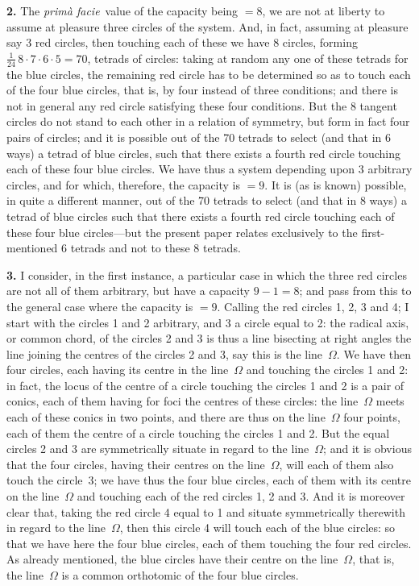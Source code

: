 \documentclass[12pt,a4paper]{article}
\newcommand{\primd}{\textit{prim\`a facie}}
\begin{document}
\textbf{2.} The \primd\ value of the capacity being $=8$, we are not at liberty to assume at pleasure three circles of the system. And, in fact, assuming at pleasure say 3 red circles, then touching each of these we have 8 circles, forming $\frac{1}{24}\, 8 \cdot 7 \cdot 6 \cdot 5 = 70$, tetrads of circles: taking at random any one of these tetrads for the blue circles, the remaining red circle has to be determined so as to touch each of the four blue circles, that is, by four instead of three conditions; and there is not in general any red circle satisfying these four conditions. But the 8 tangent circles do not stand to each other in a relation of symmetry, but form in fact four pairs of circles; and it is possible out of the 70 tetrads to select (and that in 6 ways) a tetrad of blue circles, such that there exists a fourth red circle touching each of these four blue circles. We have thus a system depending upon 3 arbitrary circles, and for which, therefore, the capacity is $=9$. It is (as is known) possible, in quite a different manner, out of the 70 tetrads to select (and that in 8 ways) a tetrad of blue circles such that there exists a fourth red circle touching each of these four blue circles---but the present paper relates exclusively to the first-mentioned 6 tetrads and not to these 8 tetrads.

\textbf{3.} I consider, in the first instance, a particular case in which the three red circles are not all of them arbitrary, but have a capacity $9-1=8$; and pass from this to the general case where the capacity is $=9$. Calling the red circles 1, 2, 3 and 4; I start with the circles 1 and 2 arbitrary, and 3 a circle equal to 2: the radical axis, or common chord, of the circles 2 and 3 is thus a line bisecting at right angles the line joining the centres of the circles 2 and 3, say this is the line~$\Omega$. We have then four circles, each having its centre in the line~$\Omega$ and touching the circles 1 and 2: in fact, the locus of the centre of a circle touching the circles 1 and 2 is a pair of conics, each of them having for foci the centres of these circles: the line~$\Omega$ meets each of these conics in two points, and there are thus on the line~$\Omega$ four points, each of them the centre of a circle touching the circles 1 and 2. But the equal circles 2 and 3 are symmetrically situate in regard to the line~$\Omega$; and it is obvious that the four circles, having their centres on the line~$\Omega$, will each of them also touch the circle~3; we have thus the four blue circles, each of them with its centre on the line~$\Omega$ and touching each of the red circles 1, 2 and 3. And it is moreover clear that, taking the red circle 4 equal to 1 and situate symmetrically therewith in regard to the line~$\Omega$, then this circle 4 will touch each of the blue circles: so that we have here the four blue circles, each of them touching the four red circles. As already mentioned, the blue circles have their centre on the line~$\Omega$, that is, the line~$\Omega$ is a common orthotomic of the four blue circles.
\end{document}
